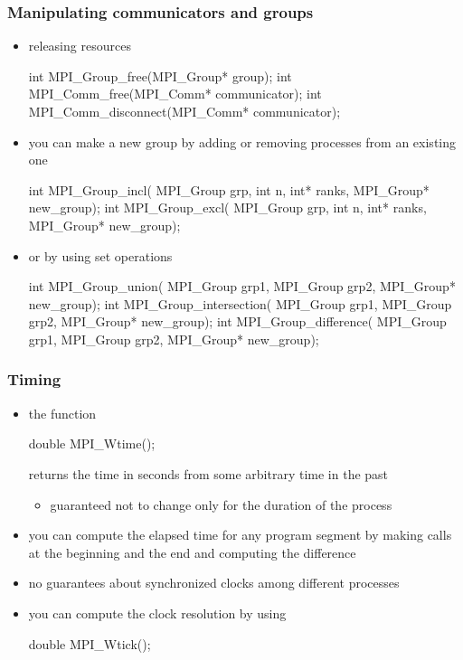 \begin{frame}[fragile]
%
  \frametitle{Manipulating communicators and groups}
%
  \begin{itemize}
%
  \item releasing resources
    \begin{C}
int MPI_Group_free(MPI_Group* group);
int MPI_Comm_free(MPI_Comm* communicator);
int MPI_Comm_disconnect(MPI_Comm* communicator);
    \end{C}
%
  \item you can make a new group by adding or removing processes from an existing one
    \begin{C}
int MPI_Group_incl(
    MPI_Group grp, int n, int* ranks, MPI_Group* new_group);
int MPI_Group_excl(
    MPI_Group grp, int n, int* ranks, MPI_Group* new_group);
    \end{C}
%
  \item or by using set operations
    \begin{C}
int MPI_Group_union(
    MPI_Group grp1, MPI_Group grp2, MPI_Group* new_group);
int MPI_Group_intersection(
    MPI_Group grp1, MPI_Group grp2, MPI_Group* new_group);
int MPI_Group_difference(
    MPI_Group grp1, MPI_Group grp2, MPI_Group* new_group);
    \end{C}
%
  \end{itemize}
%
\end{frame}

\begin{frame}[fragile]
%
  \frametitle{Timing}
%
  \begin{itemize}
%
  \item the function
    \begin{C}
double MPI_Wtime();
    \end{C}
    returns the time in seconds from some arbitrary time in the past
    \begin{itemize}
    \item guaranteed not to change only for the duration of the process
    \end{itemize}
%
  \item you can compute the elapsed time for any program segment by making calls at the
    beginning and the end and computing the difference
%
  \item no guarantees about synchronized clocks among different processes
%
  \item you can compute the clock resolution by using
    \begin{C}
double MPI_Wtick();
    \end{C}
%
  \end{itemize}
%
\end{frame}

